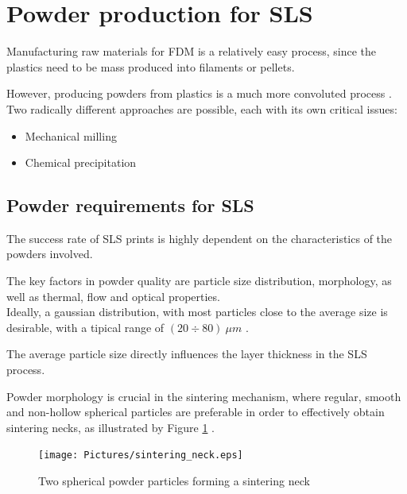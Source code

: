 \documentclass{article}
\begin{document}
    \section{Powder production for SLS \label{Powder_production}}

    Manufacturing raw materials for FDM is a relatively easy process, since the plastics need to be mass produced into filaments or pellets.

    However, producing powders from plastics is a much more convoluted process \autocites{doi:10.1063/1.4918516,Dechet_Schmidt_thermal_rounding,Recent_progress_polymers_AM}. \\ 

    Two radically different approaches are possible, each with its own critical issues: 

    \begin{itemize}
        \item Mechanical milling
        \item Chemical precipitation
    \end{itemize} 

    \subsection{Powder requirements for SLS \label{Powder_requirements}}

    The success rate of SLS prints is highly dependent on the characteristics of the powders involved. 

    The key factors in powder quality are particle size distribution, morphology, as well as thermal, flow and optical properties. \\
    
    Ideally, a gaussian distribution, with most particles close to the average size is desirable, 
    with a tipical range of $(20 \div 80) \ \mu m$ \autocite*{doi:10.1063/1.4918516}. 

    The average particle size directly influences the layer thickness in the SLS process.  
    
    Powder morphology is crucial in the sintering mechanism, where regular, smooth and non-hollow spherical 
    particles are preferable in order to effectively obtain sintering necks, as illustrated by Figure \ref{fig:SLS_sintering_neck} \autocite*{doi:10.1063/1.4918516}.  

    \begin{figure}[ht]
        \centering
        \texttt{[image: Pictures/sintering\_neck.eps]}\\
        \caption{Two spherical powder particles forming a sintering neck} 
        \label{fig:SLS_sintering_neck}
    \end{figure}
\end{document}
